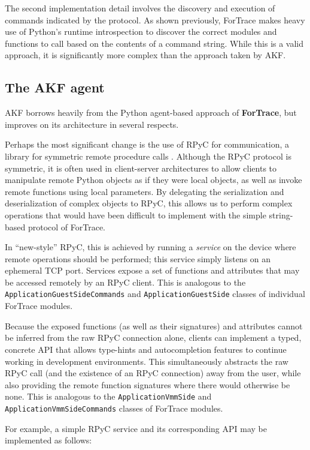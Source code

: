 The second implementation detail involves the discovery and execution of
commands indicated by the protocol. As shown previously, ForTrace makes
heavy use of Python's runtime introspection to discover the correct
modules and functions to call based on the contents of a command string.
While this is a valid approach, it is significantly more complex than
the approach taken by AKF.

\subsection{The AKF agent}\label{the-akf-agent}

AKF borrows heavily from the Python agent-based approach of
\textbf{ForTrace}, but improves on its architecture in several respects.

Perhaps the most significant change is the use of RPyC for
communication, a library for symmetric remote procedure calls
\cite{TomerfilibaorgRpyc2025}. Although the RPyC protocol is
symmetric, it is often used in client-server architectures to allow
clients to manipulate remote Python objects as if they were local
objects, as well as invoke remote functions using local parameters. By
delegating the serialization and deserialization of complex objects to
RPyC, this allows us to perform complex operations that would have been
difficult to implement with the simple string-based protocol of
ForTrace.

In ``new-style'' RPyC, this is achieved by running a \emph{service} on
the device where remote operations should be performed; this service
simply listens on an ephemeral TCP port. Services expose a set of
functions and attributes that may be accessed remotely by an RPyC
client. This is analogous to the \texttt{ApplicationGuestSideCommands}
and \texttt{ApplicationGuestSide} classes of individual ForTrace
modules.

Because the exposed functions (as well as their signatures) and
attributes cannot be inferred from the raw RPyC connection alone,
clients can implement a typed, concrete API that allows type-hints and
autocompletion features to continue working in development environments.
This simultaneously abstracts the raw RPyC call (and the existence of an
RPyC connection) away from the user, while also providing the remote
function signatures where there would otherwise be none. This is
analogous to the \texttt{ApplicationVmmSide} and
\texttt{ApplicationVmmSideCommands} classes of ForTrace modules.

For example, a simple RPyC service and its corresponding API may be
implemented as follows:

